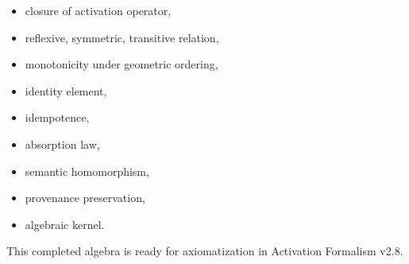 \documentclass[11pt]{article}
\begin{document}
\begin{itemize}
\item closure of activation operator,
\item reflexive, symmetric, transitive relation,
\item monotonicity under geometric ordering,
\item identity element,
\item idempotence,
\item absorption law,
\item semantic homomorphism,
\item provenance preservation,
\item algebraic kernel.
\end{itemize}

This completed algebra is ready for axiomatization in Activation Formalism v2.8.
\end{document}
